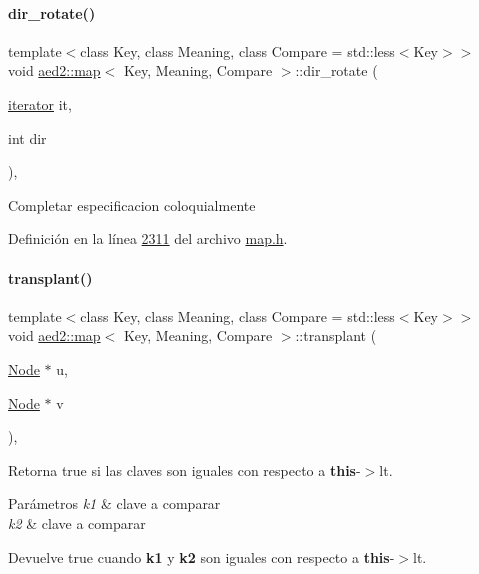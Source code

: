 \paragraph{\texorpdfstring{dir\+\_\+rotate()}{dir\_rotate()}}
{\footnotesize\ttfamily template$<$class Key, class Meaning, class Compare = std\+::less$<$\+Key$>$$>$ \\
void \hyperlink{classaed2_1_1map}{aed2\+::map}$<$ Key, Meaning, Compare $>$\+::dir\+\_\+rotate (\begin{DoxyParamCaption}\item[{\hyperlink{classaed2_1_1map_1_1iterator}{iterator}}]{it,  }\item[{int}]{dir }\end{DoxyParamCaption})\hspace{0.3cm}{\ttfamily [inline]}, {\ttfamily [private]}}

Completar especificacion coloquialmente 

Definición en la línea \hyperlink{map_8h_source_l02311}{2311} del archivo \hyperlink{map_8h_source}{map.\+h}.

\mbox{\label{classaed2_1_1map_a98b9f200c64ce02dfb67902ee00e375a_a98b9f200c64ce02dfb67902ee00e375a}} 
\paragraph{\texorpdfstring{transplant()}{transplant()}}
{\footnotesize\ttfamily template$<$class Key, class Meaning, class Compare = std\+::less$<$\+Key$>$$>$ \\
void \hyperlink{classaed2_1_1map}{aed2\+::map}$<$ Key, Meaning, Compare $>$\+::transplant (\begin{DoxyParamCaption}\item[{\hyperlink{structaed2_1_1map_1_1Node}{Node} $\ast$}]{u,  }\item[{\hyperlink{structaed2_1_1map_1_1Node}{Node} $\ast$}]{v }\end{DoxyParamCaption})\hspace{0.3cm}{\ttfamily [inline]}, {\ttfamily [private]}}



Retorna true si las claves son iguales con respecto a {\bfseries this}-\/$>$lt. 


\begin{DoxyParams}{Parámetros}
{\em k1} & clave a comparar \\
\hline
{\em k2} & clave a comparar \\
\hline
\end{DoxyParams}
\begin{DoxyReturn}{Devuelve}
true cuando {\bfseries k1} y {\bfseries k2} son iguales con respecto a {\bfseries this}-\/$>$lt. 
\end{DoxyReturn}


